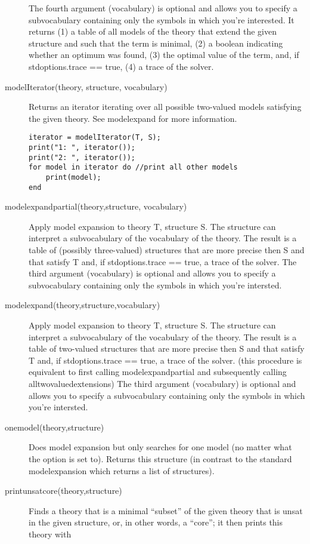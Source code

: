 \begin{description}
	The fourth argument (vocabulary) is optional and allows you to specify a subvocabulary containing only the symbols in which you're interested.			
	It returns (1) a table of all models of the theory that extend the given structure and such that the term is minimal,
	(2) a boolean indicating whether an optimum was found,
	(3) the optimal value of the term,
	and, if stdoptions.trace == true, (4) a trace of the solver.
	\item[modelIterator(theory, structure, vocabulary)]
			Returns an iterator iterating over all possible two-valued models satisfying the given theory. See modelexpand for more information.
\begin{lstlisting}
iterator = modelIterator(T, S);
print("1: ", iterator());
print("2: ", iterator());
for model in iterator do //print all other models
	print(model);
end
\end{lstlisting}
	\item[modelexpandpartial(theory,structure, vocabulary)]
		Apply model expansion to theory T, structure S. The structure can interpret a subvocabulary of the vocabulary of the theory.
 		The result is a table of (possibly three-valued) structures that are more precise then S and that satisfy T  and, if stdoptions.trace == true, a trace of the solver.
		The third argument (vocabulary) is optional and allows you to specify a subvocabulary containing only the symbols in which you're intersted.
	\item[modelexpand(theory,structure,vocabulary)]
 		Apply model expansion to theory T, structure S. The structure can interpret a subvocabulary of the vocabulary of the theory.
 		The result is a table of two-valued structures that are more precise then S and that satisfy T and, if stdoptions.trace == true, a trace of the solver.
		(this procedure is equivalent to first calling modelexpandpartial and subsequently calling alltwovaluedextensions) 
		The third argument (vocabulary) is optional and allows you to specify a subvocabulary containing only the symbols in which you're intersted.
	\item[onemodel(theory,structure)]
		Does model expansion but only searches for one model (no matter what the  option is set to). Returns this structure (in contrast to the standard modelexpansion which returns a list of structures).
	\item[printunsatcore(theory,structure)]
		Finds a theory that is a minimal ``subset'' of the given theory that is unsat in the given structure, or, in other words, a ``core''; it then prints this theory with 

\end{description}
